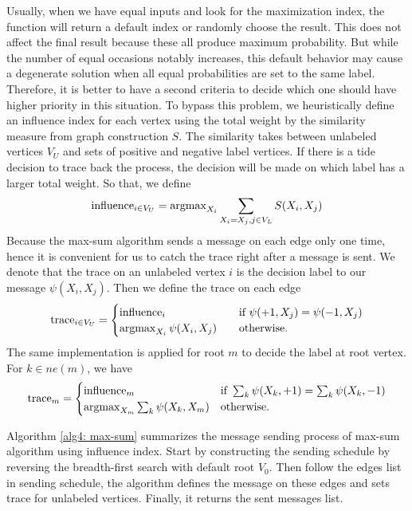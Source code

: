 Usually, when we have equal inputs and look for the maximization index, the function will return a default index or randomly choose the result. This does not affect the final result because these all produce maximum probability. But while the number of equal occasions notably increases, this default behavior may cause a degenerate solution when all equal probabilities are set to the same label. Therefore, it is better to have a second criteria to decide which one should have higher priority in this situation. To bypass this problem,  we heuristically define an influence index for each vertex using the total weight by the similarity measure from graph construction $S$. The similarity takes between unlabeled vertices $V_U$ and sets of positive and negative label vertices. If there is a tide decision to trace back the process, the decision will be made on which label has a larger total weight. So that, we define
\begin{align}
	\textnormal{influence}_{i \in V_U} = \operatorname{argmax}_{X_i}{ \sum_{X_i = X_j, j \in V_L}{S(X_i, X_j)} }
\end{align}
Because the max-sum algorithm sends a message on each edge only one time, hence it is convenient for us to catch the trace right after a message is sent. We denote that the trace on an unlabeled vertex $i$ is the decision label to our message $\psi(X_i, X_j)$. Then we define the trace on each edge
\begin{align}
	\textnormal{trace}_{i \in V_U} = 
	\begin{cases}
	\textnormal{influence}_{i} &\quad \text{if } \psi(+1, X_j) = \psi(-1, X_j)\\
	\operatorname{argmax}_{X_i}{\psi(X_i, X_j)} &\quad \text{otherwise.}
	\end{cases}
\end{align}
The same implementation is applied for root $m$ to decide the label at root vertex. For $k\in ne(m)$, we have
\begin{align}
	\textnormal{trace}_{m} = 
	\begin{cases}
	\textnormal{influence}_{m} & \text{if } \sum_{k}{\psi(X_k, +1)} = \sum_{k}{\psi(X_k, -1)}\\
	\operatorname{argmax}_{X_m}{\sum_{k}{\psi(X_k, X_m)}} & \text{otherwise.}
	\end{cases}
	\label{equal4: trace at root}
\end{align}

Algorithm \ref{alg4: max-sum} summarizes the message sending process of max-sum algorithm using influence index. Start by constructing the sending schedule by reversing the breadth-first search with default root $V_0$. Then follow the edges list in sending schedule, the algorithm defines the message on these edges and sets trace for unlabeled vertices. Finally, it returns the sent messages list.

